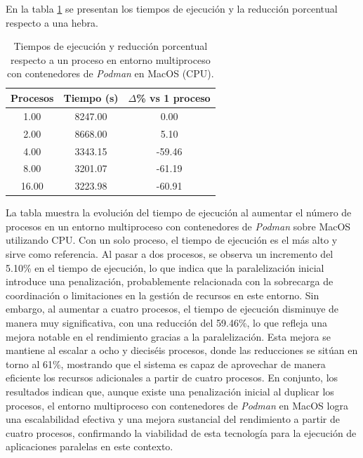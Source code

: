 En la tabla \ref{tab:multi-node_mac_podman} se presentan los tiempos de ejecución y la reducción porcentual respecto a una hebra.

\begin{table}[ht]
    \centering
    \begin{tabular}{|c|c|c|}
        \hline
        \textbf{Procesos} & \textbf{Tiempo (s)} & \textbf{$\Delta$\% vs 1 proceso} \\
        \hline
        1.00              & 8247.00             & 0.00                             \\
        2.00              & 8668.00             & 5.10                             \\
        4.00              & 3343.15             & -59.46                           \\
        8.00              & 3201.07             & -61.19                           \\
        16.00             & 3223.98             & -60.91                           \\
        \hline
    \end{tabular}
    \caption{Tiempos de ejecución y reducción porcentual respecto a un proceso en entorno multiproceso con contenedores de \textit{Podman} en MacOS (CPU).}
    \label{tab:multi-node_mac_podman}
\end{table}

La tabla muestra la evolución del tiempo de ejecución al aumentar el número de procesos en un entorno multiproceso con contenedores de \textit{Podman} sobre MacOS utilizando CPU. Con un solo proceso, el tiempo de ejecución es el más alto y sirve como referencia. Al pasar a dos procesos, se observa un incremento del 5.10\% en el tiempo de ejecución, lo que indica que la paralelización inicial introduce una penalización, probablemente relacionada con la sobrecarga de coordinación o limitaciones en la gestión de recursos en este entorno. Sin embargo, al aumentar a cuatro procesos, el tiempo de ejecución disminuye de manera muy significativa, con una reducción del 59.46\%, lo que refleja una mejora notable en el rendimiento gracias a la paralelización. Esta mejora se mantiene al escalar a ocho y dieciséis procesos, donde las reducciones se sitúan en torno al 61\%, mostrando que el sistema es capaz de aprovechar de manera eficiente los recursos adicionales a partir de cuatro procesos. En conjunto, los resultados indican que, aunque existe una penalización inicial al duplicar los procesos, el entorno multiproceso con contenedores de \textit{Podman} en MacOS logra una escalabilidad efectiva y una mejora sustancial del rendimiento a partir de cuatro procesos, confirmando la viabilidad de esta tecnología para la ejecución de aplicaciones paralelas en este contexto.

